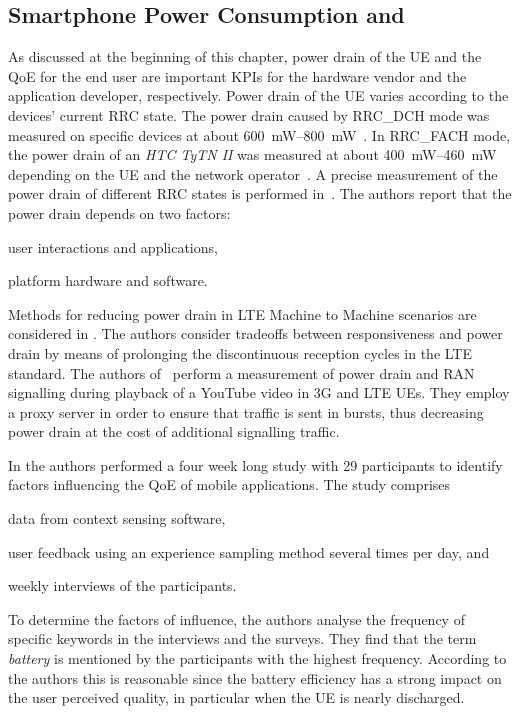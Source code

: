 \subsection{Smartphone Power Consumption and }\label{sec:network:background:energy_consumption_qoe}
As discussed at the beginning of this chapter, power drain of the \gls{UE} and the \gls{QoE} for the end user are important \glspl{KPI} for the hardware vendor and the application developer, respectively.
Power drain of the \gls{UE} varies according to the devices' current \gls{RRC} state.
The power drain caused by \gls{RRC_DCH} mode was measured on specific devices at about \SIrange{600}{800}{\milli\watt}~\cite{Qian2011a,Qian2010a}.
In \gls{RRC_FACH} mode, the power drain of an \emph{HTC TyTN II} was measured at about \SIrange{400}{460}{\milli\watt} depending on the \gls{UE} and the network operator~\cite{Qian2010a}.
A precise measurement of the power drain of different \gls{RRC} states is performed in~\cite{Qian2010a,Balasubramanian2009,Lee2004}.
The authors report that the power drain depends on two factors:
\begin{enumerate*}
\item user interactions and applications,
\item platform hardware and software.
\end{enumerate*}
Methods for reducing power drain in \gls{LTE} Machine to Machine scenarios are considered in \cite{Tirronen2012}.
The authors consider tradeoffs between responsiveness and power drain by means of prolonging the discontinuous reception cycles in the \gls{LTE} standard.
The authors of~\cite{Siekkinen2013} perform a measurement of power drain and \gls{RAN} signalling during playback of a YouTube video in \gls{3G} and \gls{LTE} \glspl{UE}.
They employ a proxy server in order to ensure that traffic is sent in bursts, thus decreasing power drain at the cost of additional signalling traffic.

In \cite{Ickin2012} the authors performed a four week long study with 29 participants to identify factors influencing the \gls{QoE} of mobile applications.
The study comprises
\begin{enumerate*}
\item data from context sensing software,
\item user feedback using an experience sampling method several times per day, and
\item weekly interviews of the participants.
\end{enumerate*}
To determine the factors of influence, the authors analyse the frequency of specific keywords in the interviews and the surveys.
They find that the term \emph{battery} is mentioned by the participants with the highest frequency.
According to the authors this is reasonable since the battery efficiency has a strong impact on the user perceived quality, in particular when the \gls{UE} is nearly discharged.
